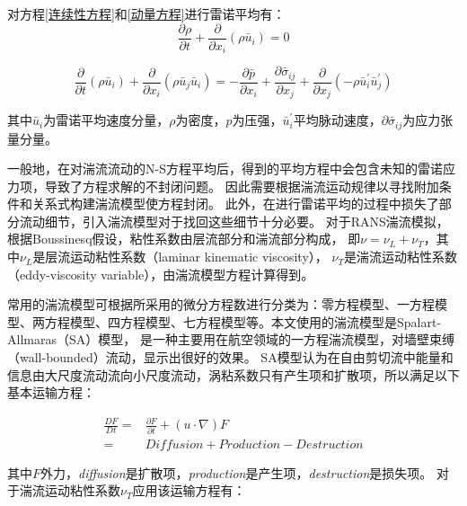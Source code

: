 \noindent 对方程\ref{连续性方程}和\ref{动量方程}进行雷诺平均有：
\begin{equation}\frac{\partial \rho}{\partial t}+\frac{\partial}{\partial x_{i}}\left(\rho \bar{u}_{i}\right)=0\end{equation}

\begin{equation}\frac{\partial}{\partial t}\left(\rho \bar{u}_{i}\right)+\frac{\partial}{\partial x_{i}}\left(\rho \bar{u}_{j} \bar{u}_{i}\right)=-\frac{\partial \bar{p}}{\partial x_{i}}+\frac{\partial \bar{\sigma}_{i j}}{\partial x_{j}}+\frac{\partial}{\partial x_{j}}\left(-\rho \bar{u}_{i}^{\prime} \bar{u}_{j}^{\prime}\right)\end{equation}

\noindent 其中$\bar{u}_{i}$为雷诺平均速度分量，$\rho$为密度，$p$为压强，$\bar{u}_{i}^{\prime}$平均脉动速度，$\partial \bar{\sigma}_{i j}$为应力张量分量。


一般地，在对湍流流动的N-S方程平均后，得到的平均方程中会包含未知的雷诺应力项，导致了方程求解的不封闭问题。
因此需要根据湍流运动规律以寻找附加条件和关系式构建湍流模型使方程封闭。
此外，在进行雷诺平均的过程中损失了部分流动细节，引入湍流模型对于找回这些细节十分必要。
对于RANS湍流模拟，根据Boussinesq\cite{schmitt2007boussinesq}假设，粘性系数由层流部分和湍流部分构成，
即$\nu=\nu_{L}+\nu_{T}$，其中$\nu_{L}$是层流运动粘性系数（laminar kinematic viscosity）， $\nu_{T}$是湍流运动粘性系数（eddy-viscosity variable），由湍流模型方程计算得到。

常用的湍流模型可根据所采用的微分方程数进行分类为：零方程模型、一方程模型、两方程模型、四方程模型、七方程模型等\cite{1998A}。本文使用的湍流模型是Spalart-Allmaras（SA）模型\cite{SAequation}，
是一种主要用在航空领域的一方程湍流模型，对墙壁束缚（wall-bounded）流动，显示出很好的效果。
SA模型认为在自由剪切流中能量和信息由大尺度流动流向小尺度流动，涡粘系数只有产生项和扩散项，所以满足以下基本运输方程：

\begin{equation}
\begin{split}
\frac{D F}{D t}= & \frac{\partial F}{\partial t}+(u \cdot \nabla) F \\ = & {Diffusion} + {Production} - {Destruction}
\end{split}
\end{equation}

\noindent 其中$F$外力，\textit{diffusion}是扩散项，\textit{production}是产生项，\textit{destruction}是损失项。
对于湍流运动粘性系数$\nu_{T}$应用该运输方程有：

